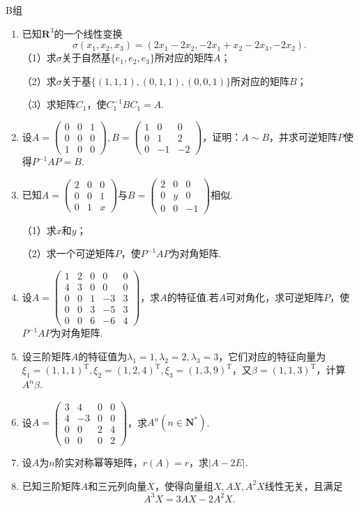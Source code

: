 \centerline{\heiti B组}
\begin{enumerate}
	\item 已知$\mathbf{R}^3$的一个线性变换
	$$\sigma(x_1,x_2,x_3)=(2x_1-2x_2,-2x_1+x_2-2x_3,-2x_2).$$
	（1）求$\sigma$关于自然基$\{e_1,e_2,e_3\}$所对应的矩阵$A$；
	
	（2）求$\sigma$关于基$\{(1,1,1),(0,1,1),(0,0,1)\}$所对应的矩阵$B$；

	（3）求矩阵$C_1$，使$C_1^{-1}BC_1=A$.
	\item 设$A=\begin{pmatrix}
		0 & 0 & 1 \\ 0 & 0 & 0 \\ 1 & 0 & 0
	\end{pmatrix},B=\begin{pmatrix}
		1 & 0 & 0 \\ 0 & 1 & 2 \\ 0 & -1 & -2
	\end{pmatrix}$，证明：$A\sim B$，并求可逆矩阵$P$使得$P^{-1}AP=B$.
	\item 已知$A=\begin{pmatrix}
		2 & 0 & 0 \\ 0 & 0 & 1 \\ 0 & 1 & x
	\end{pmatrix}$与$B=\begin{pmatrix}
		2 & 0 & 0 \\ 0 & y & 0 \\ 0 & 0 & -1
	\end{pmatrix}$相似.

	（1）求$x$和$y$；

	（2）求一个可逆矩阵$P$，使$P^{-1}AP$为对角矩阵.
	\item 设$A=\begin{pmatrix}
		1 & 2 & 0 & 0 & 0 \\ 4 & 3 & 0 & 0 & 0 \\ 0 & 0 & 1 & -3 & 3 \\ 0 & 0 & 3 & -5 & 3 \\ 
		0 & 0 & 6 & -6 & 4
	\end{pmatrix}$，求$A$的特征值.若$A$可对角化，求可逆矩阵$P$，使$P^{-1}AP$为对角矩阵.
	\item 设三阶矩阵$A$的特征值为$\lambda_1=1,\lambda_2=2,\lambda_3=3$，它们对应的特征向量为$\xi_1=(1,1,1)^\mathrm{T},
	\xi_2=(1,2,4)^\mathrm{T},\xi_3=(1,3,9)^\mathrm{T}$，又$\beta=(1,1,3)^\mathrm{T}$，计算$A^n\beta$.
	\item 设$A=\begin{pmatrix}
		3 & 4 & 0 & 0 \\ 4 & -3 & 0 & 0 \\ 0 & 0 & 2 & 4 \\ 0 & 0 & 0 & 2
	\end{pmatrix}$，求$A^n(n\in\mathbf{N^*})$.
	\item 设$A$为$n$阶实对称幂等矩阵，$r(A)=r$，求$|A-2E|$.
	\item 已知三阶矩阵$A$和三元列向量$X$，使得向量组$X,AX,A^2X$线性无关，且满足
	$$A^3X=3AX-2A^2X.$$


\end{enumerate}
